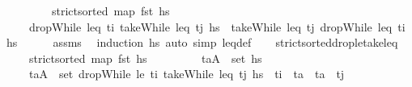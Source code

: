 \begin{isabellebody}
\ \ \ \ \ \ \ \ \ {\isachardoublequoteopen}strict{\isacharunderscore}{\kern0pt}sorted\ {\isacharparenleft}{\kern0pt}map\ fst\ hs{\isacharparenright}{\kern0pt}{\isachardoublequoteclose}\isanewline
\ \ \ \ \ {\isachardoublequoteopen}dropWhile\ {\isacharparenleft}{\kern0pt}leq\ t\isactrlsub i{\isacharparenright}{\kern0pt}\ {\isacharparenleft}{\kern0pt}takeWhile\ {\isacharparenleft}{\kern0pt}leq\ t\isactrlsub j{\isacharparenright}{\kern0pt}\ hs{\isacharparenright}{\kern0pt}\ {\isacharequal}{\kern0pt}\ takeWhile\ {\isacharparenleft}{\kern0pt}leq\ t\isactrlsub j{\isacharparenright}{\kern0pt}\ {\isacharparenleft}{\kern0pt}dropWhile\ {\isacharparenleft}{\kern0pt}leq\ t\isactrlsub i{\isacharparenright}{\kern0pt}\ hs{\isacharparenright}{\kern0pt}{\isachardoublequoteclose}\isanewline
%
\isadelimproof
\ \ \ \ %
\endisadelimproof
%
\isatagproof
{}\isamarkupfalse%
\ assms\ \isamarkupfalse%
\ {\isacharparenleft}{\kern0pt}induction\ hs{\isacharparenright}{\kern0pt}\ {\isacharparenleft}{\kern0pt}auto\ simp{\isacharcolon}{\kern0pt}\ leq{\isacharunderscore}{\kern0pt}def{\isacharparenright}{\kern0pt}%
\endisatagproof
{\isafoldproof}%
%
\isadelimproof
\isanewline
%
\endisadelimproof
\isanewline
\ \ \isamarkupfalse%
\ strict{\isacharunderscore}{\kern0pt}sorted{\isacharunderscore}{\kern0pt}drop{\isacharunderscore}{\kern0pt}le{\isacharunderscore}{\kern0pt}take{\isacharunderscore}{\kern0pt}leq{\isacharcolon}{\kern0pt}\isanewline
\ \ \ \ \ {\isachardoublequoteopen}strict{\isacharunderscore}{\kern0pt}sorted\ {\isacharparenleft}{\kern0pt}map\ fst\ hs{\isacharparenright}{\kern0pt}{\isachardoublequoteclose}\isanewline
\ \ \ \ \ \ \ \ \ {\isachardoublequoteopen}{\isacharparenleft}{\kern0pt}t\isactrlsub a{\isacharcomma}{\kern0pt}A{\isacharparenright}{\kern0pt}\ {\isasymin}\ set\ hs{\isachardoublequoteclose}\isanewline
\ \ \ \ \ {\isachardoublequoteopen}{\isacharparenleft}{\kern0pt}t\isactrlsub a{\isacharcomma}{\kern0pt}A{\isacharparenright}{\kern0pt}\ {\isasymin}\ set\ {\isacharparenleft}{\kern0pt}dropWhile\ {\isacharparenleft}{\kern0pt}le\ t\isactrlsub i{\isacharparenright}{\kern0pt}\ {\isacharparenleft}{\kern0pt}takeWhile\ {\isacharparenleft}{\kern0pt}leq\ t\isactrlsub j{\isacharparenright}{\kern0pt}\ hs{\isacharparenright}{\kern0pt}{\isacharparenright}{\kern0pt}\ {\isasymlongleftrightarrow}\ t\isactrlsub i\ {\isasymle}\ t\isactrlsub a\ {\isasymand}\ t\isactrlsub a\ {\isasymle}\ t\isactrlsub j{\isachardoublequoteclose}\isanewline

\end{isabellebody}
